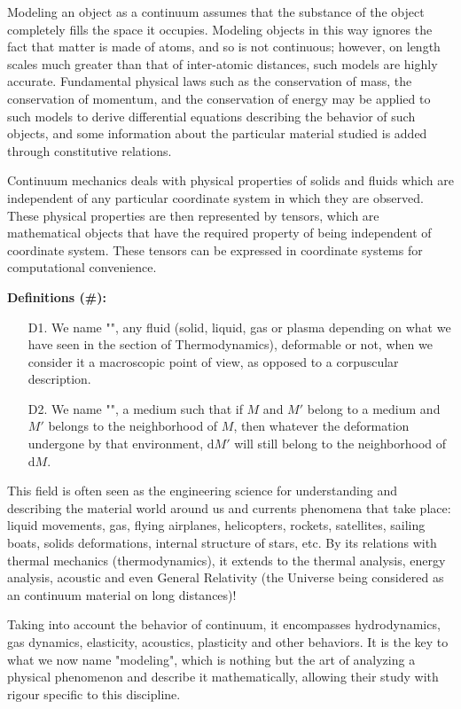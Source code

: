 	Modeling an object as a continuum assumes that the substance of the object completely fills the space it occupies. Modeling objects in this way ignores the fact that matter is made of atoms, and so is not continuous; however, on length scales much greater than that of inter-atomic distances, such models are highly accurate. Fundamental physical laws such as the conservation of mass, the conservation of momentum, and the conservation of energy may be applied to such models to derive differential equations describing the behavior of such objects, and some information about the particular material studied is added through constitutive relations.

	Continuum mechanics deals with physical properties of solids and fluids which are independent of any particular coordinate system in which they are observed. These physical properties are then represented by tensors, which are mathematical objects that have the required property of being independent of coordinate system. These tensors can be expressed in coordinate systems for computational convenience.
	
	\textbf{Definitions (\#\mydef):}
	\begin{enumerate}
		\item[D1.] We name "", any fluid (solid, liquid, gas or plasma depending on what we have seen in the section of Thermodynamics), deformable or not, when we consider it a macroscopic point of view, as opposed to a corpuscular description.
		
		\item[D2.] We name "", a medium such that if $M$ and $M'$ belong to a medium and $M'$ belongs to the neighborhood of $M$, then whatever the deformation undergone by that environment, $\mathrm{d}M'$ will still belong to the neighborhood of $\mathrm{d}M$.
	\end{enumerate}
	This field is often seen as the engineering science for understanding and describing the material world around us and currents phenomena that take place: liquid movements, gas, flying airplanes, helicopters, rockets, satellites, sailing boats, solids deformations, internal structure of stars, etc. By its relations with  thermal mechanics (thermodynamics), it extends to the thermal analysis, energy analysis, acoustic and even General Relativity (the Universe being considered as an continuum material on long distances)!
	
	Taking into account the behavior of continuum, it encompasses hydrodynamics, gas dynamics, elasticity, acoustics, plasticity and other behaviors. It is the key to what we now name "modeling", which is nothing but the art of analyzing a physical phenomenon and describe it mathematically, allowing their study with rigour specific to this discipline.
	
